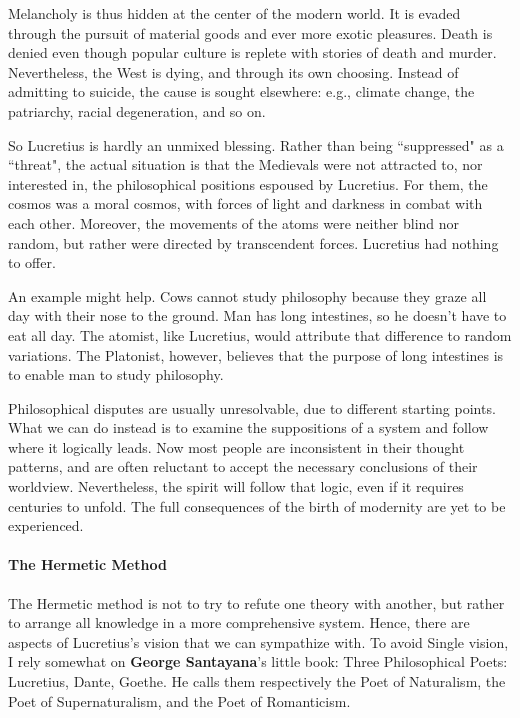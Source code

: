 Melancholy is thus hidden at the center of the modern world. It is evaded through the pursuit of material goods and ever more exotic pleasures. Death is denied even though popular culture is replete with stories of death and murder. Nevertheless, the West is dying, and through its own choosing. Instead of admitting to suicide, the cause is sought elsewhere: e.g., climate change, the patriarchy, racial degeneration, and so on.

So Lucretius is hardly an unmixed blessing. Rather than being ``suppressed" as a ``threat", the actual situation is that the Medievals were not attracted to, nor interested in, the philosophical positions espoused by Lucretius. For them, the cosmos was a moral cosmos, with forces of light and darkness in combat with each other. Moreover, the movements of the atoms were neither blind nor random, but rather were directed by transcendent forces. Lucretius had nothing to offer.

An example might help. Cows cannot study philosophy because they graze all day with their nose to the ground. Man has long intestines, so he doesn't have to eat all day. The atomist, like Lucretius, would attribute that difference to random variations. The Platonist, however, believes that the purpose of long intestines is to enable man to study philosophy.

Philosophical disputes are usually unresolvable, due to different starting points. What we can do instead is to examine the suppositions of a system and follow where it logically leads. Now most people are inconsistent in their thought patterns, and are often reluctant to accept the necessary conclusions of their worldview. Nevertheless, the spirit will follow that logic, even if it requires centuries to unfold. The full consequences of the birth of modernity are yet to be experienced.

\paragraph{The Hermetic Method}
The Hermetic method is not to try to refute one theory with another, but rather to arrange all knowledge in a more comprehensive system. Hence, there are aspects of Lucretius's vision that we can sympathize with. To avoid Single vision, I rely somewhat on \textbf{George Santayana}'s little book: Three Philosophical Poets: Lucretius, Dante, Goethe. He calls them respectively the Poet of Naturalism, the Poet of Supernaturalism, and the Poet of Romanticism.

